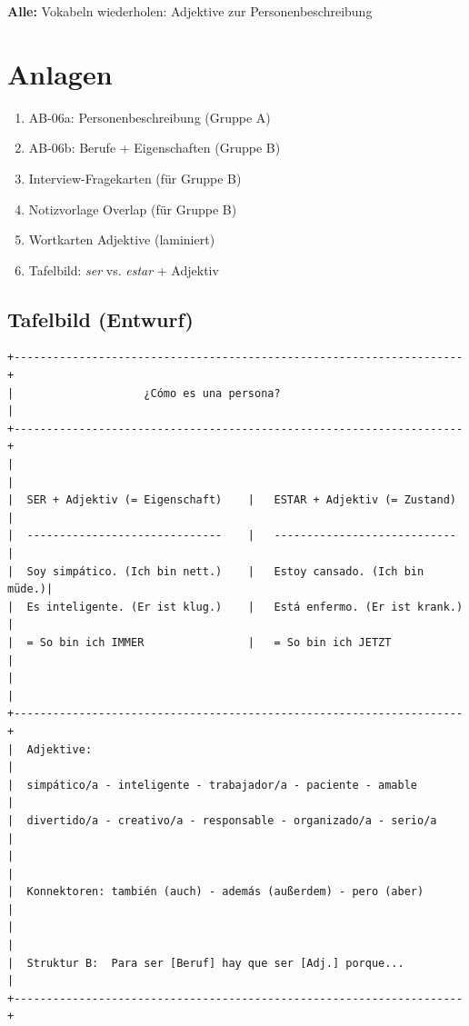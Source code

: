 \documentclass[11pt,a4paper]{article}
\begin{document}
\vspace{1em}
\textbf{Alle:} Vokabeln wiederholen: Adjektive zur Personenbeschreibung

\section{Anlagen}

\begin{enumerate}
    \item AB-06a: Personenbeschreibung (Gruppe A)
    \item AB-06b: Berufe + Eigenschaften (Gruppe B)
    \item Interview-Fragekarten (für Gruppe B)
    \item Notizvorlage Overlap (für Gruppe B)
    \item Wortkarten Adjektive (laminiert)
    \item Tafelbild: \textit{ser} vs. \textit{estar} + Adjektiv
\end{enumerate}

\subsection{Tafelbild (Entwurf)}

\begin{verbatim}
+---------------------------------------------------------------------+
|                    ¿Cómo es una persona?                            |
+---------------------------------------------------------------------+
|                                                                     |
|  SER + Adjektiv (= Eigenschaft)    |   ESTAR + Adjektiv (= Zustand) |
|  ------------------------------    |   ----------------------------  |
|  Soy simpático. (Ich bin nett.)    |   Estoy cansado. (Ich bin müde.)|
|  Es inteligente. (Er ist klug.)    |   Está enfermo. (Er ist krank.) |
|  = So bin ich IMMER                |   = So bin ich JETZT            |
|                                                                     |
+---------------------------------------------------------------------+
|  Adjektive:                                                         |
|  simpático/a - inteligente - trabajador/a - paciente - amable       |
|  divertido/a - creativo/a - responsable - organizado/a - serio/a    |
|                                                                     |
|  Konnektoren: también (auch) - además (außerdem) - pero (aber)      |
|                                                                     |
|  Struktur B:  Para ser [Beruf] hay que ser [Adj.] porque...         |
+---------------------------------------------------------------------+
\end{verbatim}
\end{document}
